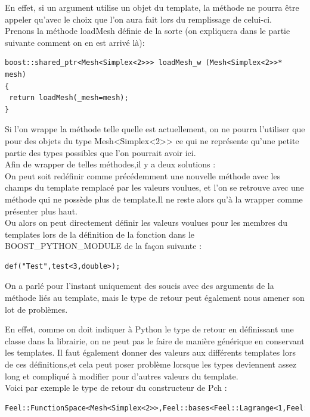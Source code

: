 \documentclass[french,12pt]{article}
\begin{document}
En effet, si un argument utilise un objet du template, la méthode ne pourra être appeler qu'avec le choix que l'on aura fait lors du remplissage de celui-ci.\\

Prenons la méthode loadMesh définie de la sorte (on expliquera dans le partie suivante comment on en est arrivé là):
\begin{lstlisting}
boost::shared_ptr<Mesh<Simplex<2>>> loadMesh_w (Mesh<Simplex<2>>* mesh)
{
 return loadMesh(_mesh=mesh);
}
\end{lstlisting}

Si l'on wrappe la méthode telle quelle est actuellement, on ne pourra l'utiliser que pour des objets du type Mesh<Simplex<2>> ce qui ne représente qu'une petite partie des types possibles que l'on pourrait avoir ici.\\

Afin de wrapper de telles méthodes,il y a deux solutions :\\

On peut soit redéfinir comme précédemment une nouvelle méthode avec les champs du template remplacé par les valeurs voulues, et l'on se retrouve avec une méthode qui ne possède plus de template.Il ne reste alors qu'à la wrapper comme présenter plus haut.\\

Ou alors on peut directement définir les valeurs voulues pour les membres du templates lors de la définition de la fonction dans le BOOST\_PYTHON\_MODULE de la façon suivante :
\begin{lstlisting}
def("Test",test<3,double>);
\end{lstlisting}

On a parlé pour l'instant uniquement des soucis avec des arguments de la méthode liés au template, mais le type de retour peut également nous amener son lot de problèmes.

En effet, comme on doit indiquer à Python le type de retour en définissant une classe dans la librairie, on ne peut pas le faire de manière générique en conservant les templates. Il faut également donner des valeurs aux différents templates lors de ces définitions,et cela peut poser problème lorsque les types deviennent assez long et compliqué à modifier pour d'autres valeurs du template.\\
Voici par exemple le type de retour du constructeur de Pch :
\begin{lstlisting}
Feel::FunctionSpace<Mesh<Simplex<2>>,Feel::bases<Feel::Lagrange<1,Feel::Scalar,Feel::Continuous,Feel::PointSetEquiSpaced,0>>,double,Feel::Periodicity<Feel::NoPeriodicity>,Feel::mortars<Feel::NoMortar>>
\end{lstlisting}
\end{document}
